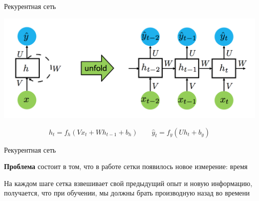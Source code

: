 \documentclass[notes,12pt, aspectratio=169]{beamer}
\newenvironment{wideitemize}{\itemize\addtolength{\itemsep}{10pt}}{\enditemize}
\begin{document}
\begin{frame}{Рекурентная сеть}
\begin{center}
	\includegraphics[width=.75\linewidth]{rnn.png}
\end{center}
\[
h_t = f_h( V x_t + W h_{t-1} + b_h) \qquad \hat y_t = f_y ( U h_t + b_y)
\]
\end{frame}



\begin{frame}{Рекурентная сеть}
\begin{wideitemize} 
	\item  \textbf{Проблема} состоит в том, что в работе сетки появилось новое измерение: время 
	
	\item На каждом шаге сетка взвешивает свой предыдущий опыт и новую информацию, получается, что при обучении, мы должны брать производную назад во времени
\end{wideitemize} 
\end{frame}
\end{document}
